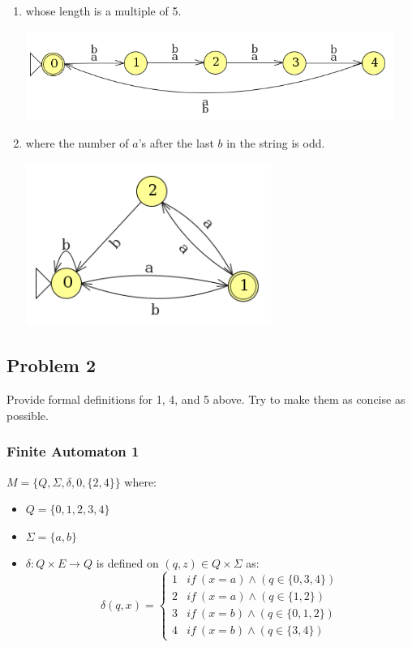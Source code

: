 \documentclass{math}
\begin{document}
\begin{enumerate}
\begin{center}
    \end{center}
  \item whose length is a multiple of 5.
    \begin{center}
      \includegraphics[width=12cm]{assets/hw_02_1_4.png}
    \end{center}
  \item where the number of \( a \)'s after the last \( b \) in the string is
    odd.
    \begin{center}
      \includegraphics[width=8cm]{assets/hw_02_1_5.png}
    \end{center}
\end{enumerate}

\subsection*{Problem 2}
Provide formal definitions for 1, 4, and 5 above. Try to make them as concise
as possible.

\subsubsection*{Finite Automaton 1}
\( M = \{Q,\Sigma,\delta,0,\{2,4\}\} \) where:
\begin{itemize}
  \item \( Q = \{0,1,2,3,4\} \)
  \item \( \Sigma = \{a,b\} \)
  \item \( \delta: Q\times E\to Q \) is defined on \( (q,z)\in Q\times\Sigma \) as:
    \[ \delta(q,x) = \begin{cases}
      1 & if\ (x = a) \wedge (q\in\{0,3,4\}) \\
      2 & if\ (x = a) \wedge (q\in\{1,2\})   \\
      3 & if\ (x = b) \wedge (q\in\{0,1,2\}) \\
      4 & if\ (x = b) \wedge (q\in\{3,4\})
    \end{cases} \]
\end{itemize}
\end{document}

